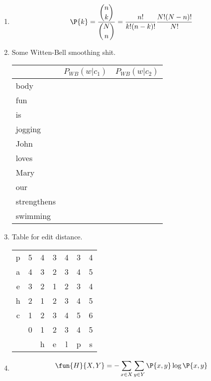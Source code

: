\documentclass[]{homework}
\begin{document}

\begin{enumerate}
	\item 
		\begin{align*}
			\P{k} &= \frac{\displaystyle {n \choose k}}{\displaystyle {N \choose n}} =
				\frac{n!}{k!(n-k)!} \frac{N!(N-n)!}{N!}\\
		\end{align*}
	\item Some Witten-Bell smoothing shit.\\
		\begin{tabular}{| l | l | l |}
			\hline
					&	$P_{WB}(w | c_1)$	&	$P_{WB}(w | c_2)$ 	\\
			\hline
			body		&						&						\\
			fun			&						&						\\
			is			&						&						\\
			jogging		&						&						\\
			John		&						&						\\
			loves		&						&						\\
			Mary		&						&						\\
			our			&						&						\\
			strengthens	&						&						\\
			swimming	&						&						\\
			\hline
		\end{tabular}
	\item 
		Table for edit distance.\\
		\begin{center}
		\begin{tabular}{|c|c|c|c|c|c|c|}
			\hline
			p &	5	& 4	& 3	& 4	& 3	& 4 \\
			a &	4	& 3	& 2	& 3	& 4	& 5	\\
			e &	3	& 2	& 1	& 2	& 3	& 4	\\
			h &	2	& 1	& 2	& 3	& 4	& 5	\\
			c &	1	& 2	& 3	& 4	& 5	& 6	\\
			  &	0	& 1	& 2	& 3	& 4	& 5	\\
			\hline
			  &		& h	& e	& l	& p	& s	\\
			\hline
		\end{tabular}
		\end{center}
	\item
		\begin{align*}
			\fun{H}{X,Y}
			&= -\sum_{x \in X} \sum_{y \in Y}\P{x,y} \log \P{x,y}\\

\end{align*}
\end{enumerate}
\end{document}
